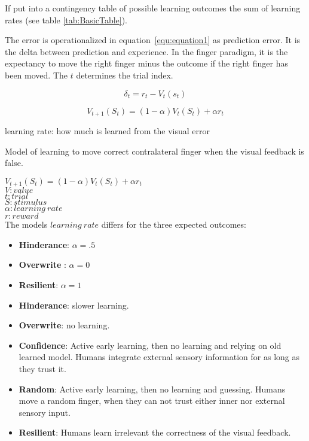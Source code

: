 \documentclass[man]{apa7}
\begin{document}
If put into a contingency table of possible learning outcomes the sum of learning rates (see table \ref{tab:BasicTable}).

The error is operationalized in equation~\ref{equ:equation1} as prediction error. It is the delta between prediction and experience. In the finger paradigm, it is the expectancy to move the right finger minus the outcome if the right finger has been moved. The $t$ determines the trial index.

\begin{equation} \label{equation1}
\delta_t = r_t - V_t(s_t)
\label{equ:equation1}
\end{equation}

\begin{equation} \label{equation2}
V_{t+1}(S_t)=(1-\alpha)V_t(S_t)+\alpha r_t    
\label{equ:equation2}
\end{equation}








learning rate: how much is learned from the visual error

Model of learning to move correct contralateral finger when the visual feedback is false.

$V_{t+1}(S_t)=(1-\alpha)V_t(S_t)+\alpha r_t$ \\
$V: value$ \\
$t: trial$ \\
$S: stimulus$ \\
$\alpha: learning\:rate$ \\
$r: reward$ \\

The models $learning\:rate$ differs for the three expected outcomes:
\begin{itemize}
    \item \textbf{Hinderance}: $\alpha = .5$
    \item \textbf{Overwrite} : $\alpha = 0$
    \item \textbf{Resilient}: $\alpha = 1$
\end{itemize}   

\begin{itemize}
    \item \textbf{Hinderance}: slower learning.
    \item \textbf{Overwrite}: no learning.
    \item \textbf{Confidence}: Active early learning, then no learning and relying on old learned model. Humans integrate external sensory information for as long as they trust it.
    \item \textbf{Random}: Active early learning, then no learning and guessing. Humans move a random finger, when they can not trust either inner nor external sensory input.
    \item \textbf{Resilient}: Humans learn irrelevant the correctness of the visual feedback.
\end{itemize}
\end{document}
